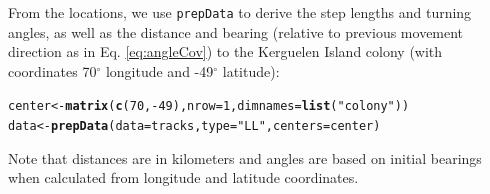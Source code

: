 \documentclass[12pt]{article}\usepackage[]{graphicx}\usepackage[]{xcolor}
\makeatletter
\newcommand{\hlnum}[1]{\textcolor[rgb]{0.686,0.059,0.569}{#1}}%
\newcommand{\hlsng}[1]{\textcolor[rgb]{0.192,0.494,0.8}{#1}}%
\newcommand{\hlopt}[1]{\textcolor[rgb]{0,0,0}{#1}}%
\newcommand{\hldef}[1]{\textcolor[rgb]{0.345,0.345,0.345}{#1}}%
\newcommand{\hlkwb}[1]{\textcolor[rgb]{0.69,0.353,0.396}{#1}}%
\newcommand{\hlkwc}[1]{\textcolor[rgb]{0.333,0.667,0.333}{#1}}%
\newcommand{\hlkwd}[1]{\textcolor[rgb]{0.737,0.353,0.396}{\textbf{#1}}}%
\newenvironment{kframe}{%
 \def\at@end@of@kframe{}%
 \ifinner\ifhmode%
  \def\at@end@of@kframe{\end{minipage}}%
  \begin{minipage}{\columnwidth}%
 \fi\fi%
 \def\FrameCommand##1{\hskip\@totalleftmargin \hskip-\fboxsep
 \colorbox{shadecolor}{##1}\hskip-\fboxsep
     \hskip-\linewidth \hskip-\@totalleftmargin \hskip\columnwidth}%
 \MakeFramed {\advance\hsize-\width
   \@totalleftmargin\z@ \linewidth\hsize
   \@setminipage}}%
 {\par\unskip\endMakeFramed%
 \at@end@of@kframe}
\newenvironment{knitrout}{}{} %
\makeatother
\begin{document}
From the locations, we use \verb|prepData| to derive the step lengths and turning angles, as well as the distance and bearing (relative to previous movement direction as in Eq. \ref{eq:angleCov}) to the Kerguelen Island colony (with coordinates 70$^{\circ}$ longitude and -49$^{\circ}$ latitude):
\begin{knitrout}
\color{fgcolor}\begin{kframe}
\begin{alltt}
\hldef{center} \hlkwb{<-} \hlkwd{matrix}\hldef{(}\hlkwd{c}\hldef{(}\hlnum{70}\hldef{,}\hlopt{-}\hlnum{49}\hldef{),}\hlkwc{nrow}\hldef{=}\hlnum{1}\hldef{,}\hlkwc{dimnames}\hldef{=}\hlkwd{list}\hldef{(}\hlsng{"colony"}\hldef{))}
\hldef{data} \hlkwb{<-} \hlkwd{prepData}\hldef{(}\hlkwc{data}\hldef{=tracks,} \hlkwc{type}\hldef{=}\hlsng{"LL"}\hldef{,} \hlkwc{centers}\hldef{=center)}
\end{alltt}
\end{kframe}
\end{knitrout}
Note that distances are in kilometers and angles are based on initial bearings \citep[using geosphere::bearing;][]{Hijmans2016geo} when calculated from longitude and latitude coordinates.  
\end{document}
